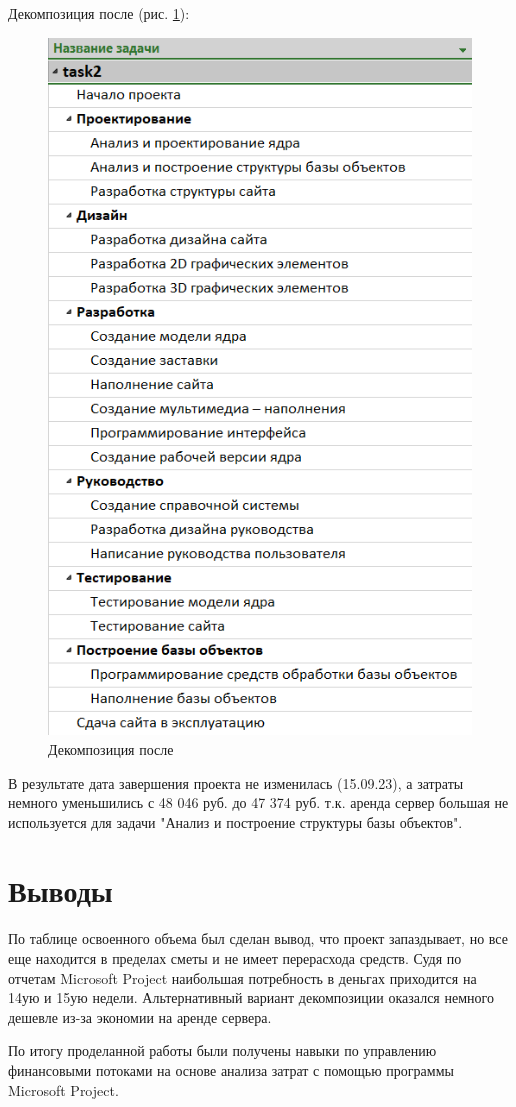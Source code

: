 \newpage
Декомпозиция после (рис. \ref{p7}):
\begin{figure}[!h]
	\centering
	\includegraphics[width=0.7\linewidth]{inc/img/7.png}
	\caption{Декомпозиция после}
	\label{p7}
\end{figure}

В результате дата завершения проекта не изменилась (15.09.23), а затраты немного уменьшились с 48 046 руб. до 47 374 руб. т.к. аренда сервер большая не используется для задачи "Анализ и построение структуры базы объектов".

\section*{Выводы}
По таблице освоенного объема был сделан вывод, что проект запаздывает, но все еще находится в пределах сметы и не имеет перерасхода средств. Судя по отчетам Microsoft Project наибольшая потребность в деньгах приходится на 14ую и 15ую недели. Альтернативный вариант декомпозиции оказался немного дешевле из-за экономии на аренде сервера.

По итогу проделанной работы были получены навыки по управлению финансовыми потоками на основе анализа затрат с помощью программы Microsoft Project.